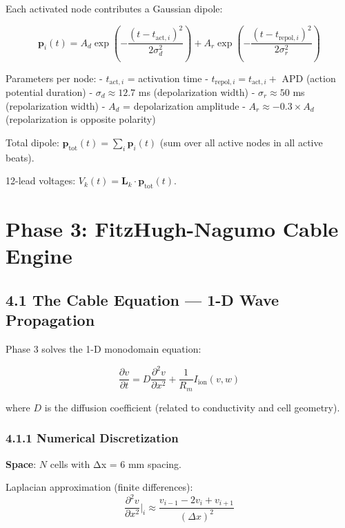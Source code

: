 \documentclass[12pt,oneside,a4paper]{book}
\begin{document}
Each activated node contributes a Gaussian dipole:

\begin{equation}
\mathbf{p}_i(t) = A_d \exp\left(-\frac{(t - t_{\text{act},i})^2}{2\sigma_d^2}\right) + A_r \exp\left(-\frac{(t - t_{\text{repol},i})^2}{2\sigma_r^2}\right)
\label{eq:dipole_gaussian}
\end{equation}

Parameters per node:
- $t_{\text{act},i}$ = activation time
- $t_{\text{repol},i} = t_{\text{act},i} +$ APD (action potential duration)
- $\sigma_d \approx 12.7$ ms (depolarization width)
- $\sigma_r \approx 50$ ms (repolarization width)
- $A_d$ = depolarization amplitude
- $A_r \approx -0.3 \times A_d$ (repolarization is opposite polarity)

Total dipole: $\mathbf{p}_{\text{tot}}(t) = \sum_i \mathbf{p}_i(t)$ (sum over all active nodes in all active beats).

12-lead voltages: $V_k(t) = \mathbf{L}_k \cdot \mathbf{p}_{\text{tot}}(t)$.

\chapter{Phase 3: FitzHugh-Nagumo Cable Engine}

\section{4.1 The Cable Equation — 1-D Wave Propagation}

Phase 3 solves the 1-D monodomain equation:

\begin{equation}
\frac{\partial v}{\partial t} = D \frac{\partial^2 v}{\partial x^2} + \frac{1}{R_m} I_{\text{ion}}(v, w)
\label{eq:monodomain}
\end{equation}

where $D$ is the diffusion coefficient (related to conductivity and cell geometry).

\subsection{4.1.1 Numerical Discretization}

\textbf{Space}: $N$ cells with Δx = 6 mm spacing.

Laplacian approximation (finite differences):
$$\frac{\partial^2 v}{\partial x^2}\bigg|_i \approx \frac{v_{i-1} - 2v_i + v_{i+1}}{(\Delta x)^2}$$
\end{document}
